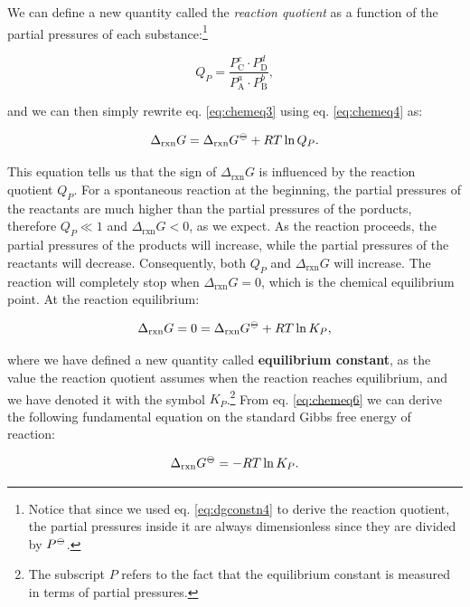 \documentclass[
]{book}
\theoremstyle{definition}
\theoremstyle{definition}
\theoremstyle{definition}
\theoremstyle{remark}
\begin{document}
We can define a new quantity called the \emph{reaction quotient} as a function of the partial pressures of each substance:\footnote{Notice that since we used eq. \eqref{eq:dgconstn4} to derive the reaction quotient, the partial pressures inside it are always dimensionless since they are divided by \(P^{-\kern-6pt{\ominus}\kern-6pt-}\).}

\begin{equation}
Q_P = \frac{P_{\text{C}}^c \cdot P_{\text{D}}^d}{P_{\text{A}}^a \cdot P_{\text{B}}^b},
\label{eq:chemeq4}
\end{equation}

and we can then simply rewrite eq. \eqref{eq:chemeq3} using eq. \eqref{eq:chemeq4} as:

\begin{equation}
\Delta_{\text{rxn}} G = \Delta_{\text{rxn}} G^{-\kern-6pt{\ominus}\kern-6pt-}+ RT \ln Q_P.
\label{eq:chemeq5}
\end{equation}

This equation tells us that the sign of \(\Delta_{\text{rxn}} G\) is influenced by the reaction quotient \(Q_P\). For a spontaneous reaction at the beginning, the partial pressures of the reactants are much higher than the partial pressures of the porducts, therefore \(Q_P \ll 1\) and \(\Delta_{\text{rxn}} G < 0\), as we expect. As the reaction proceeds, the partial pressures of the products will increase, while the partial pressures of the reactants will decrease. Consequently, both \(Q_P\) and \(\Delta_{\text{rxn}} G\) will increase. The reaction will completely stop when \(\Delta_{\text{rxn}} G = 0\), which is the chemical equilibrium point. At the reaction equilibrium:

\begin{equation}
\Delta_{\text{rxn}} G = 0 = \Delta_{\text{rxn}} G^{-\kern-6pt{\ominus}\kern-6pt-}+ RT \ln K_P,
\label{eq:chemeq6}
\end{equation}

where we have defined a new quantity called \textbf{equilibrium constant}, as the value the reaction quotient assumes when the reaction reaches equilibrium, and we have denoted it with the symbol \(K_P\).\footnote{The subscript \(P\) refers to the fact that the equilibrium constant is measured in terms of partial pressures.} From eq. \eqref{eq:chemeq6} we can derive the following fundamental equation on the standard Gibbs free energy of reaction:

\begin{equation}
\Delta_{\text{rxn}} G^{-\kern-6pt{\ominus}\kern-6pt-}= - RT \ln K_P.
\label{eq:chemeqdg0}
\end{equation}
\end{document}
